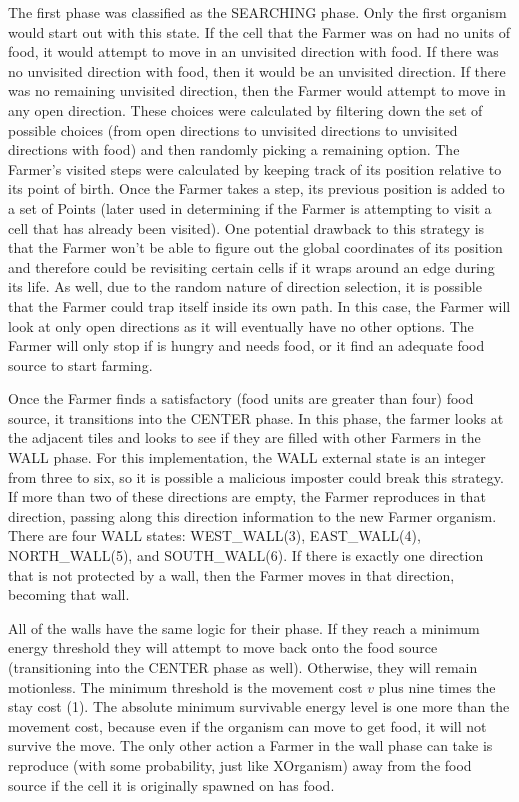 \documentclass[
10pt, %
letterpaper, %
oneside, %
headinclude,footinclude, %
english
]{article}
\begin{document}
The first phase was classified as the SEARCHING phase. Only the first organism would start out with this state. If the cell that the Farmer was on had no units of food, it would attempt to move in an unvisited direction with food. If there was no unvisited direction with food, then it would be an unvisited direction. If there was no remaining unvisited direction, then the Farmer would attempt to move in any open direction. These choices were calculated by filtering down the set of possible choices (from open directions to unvisited directions to unvisited directions with food) and then randomly picking a remaining option. The Farmer's visited steps were calculated by keeping track of its position relative to its point of birth. Once the Farmer takes a step, its previous position is added to a set of Points (later used in determining if the Farmer is attempting to visit a cell that has already been visited). One potential drawback to this strategy is that the Farmer won't be able to figure out the global coordinates of its position and therefore could be revisiting certain cells if it wraps around an edge during its life. As well, due to the random nature of direction selection, it is possible that the Farmer could trap itself inside its own path. In this case, the Farmer will look at only open directions as it will eventually have no other options. The Farmer will only stop if is hungry and needs food, or it find an adequate food source to start farming. 

Once the Farmer finds a satisfactory (food units are greater than four) food source, it transitions into the CENTER phase. In this phase, the farmer looks at the adjacent tiles and looks to see if they are filled with other Farmers in the WALL phase. For this implementation, the WALL external state is an integer from three to six, so it is possible a malicious imposter could break this strategy. If more than two of these directions are empty, the Farmer reproduces in that direction, passing along this direction information to the new Farmer organism. There are four WALL states: WEST_WALL(3), EAST_WALL(4), NORTH_WALL(5), and SOUTH_WALL(6). If there is exactly one direction that is not protected by a wall, then the Farmer moves in that direction, becoming that wall.

All of the walls have the same logic for their phase. If they reach a minimum energy threshold they will attempt to move back onto the food source (transitioning into the CENTER phase as well). Otherwise, they will remain motionless. The minimum threshold is the movement cost $v$ plus nine times the stay cost (1). The absolute minimum survivable energy level is one more than the movement cost, because even if the organism can move to get food, it will not survive the move. The only other action a Farmer in the wall phase can take is reproduce (with some probability, just like XOrganism) away from the food source if the cell it is originally spawned on has food. 
\end{document}
